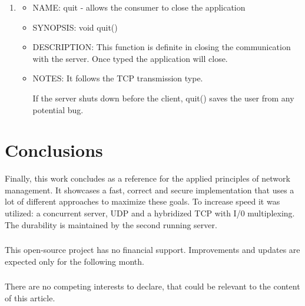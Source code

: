 \documentclass[runningheads]{llncs}
\begin{document}
\begin{enumerate}
   \item \begin{itemize} \item NAME: quit - allows the consumer to close the application
            \item SYNOPSIS: void quit()  
            \item DESCRIPTION: This function is definite in closing the communication with the server. Once typed the application will close.
            \item NOTES: It follows the TCP transmission type.
            
            If the server shuts down before the client, quit() saves the user from any potential bug.
   \end{itemize}
\end{enumerate}


\section{Conclusions}

Finally, this work concludes as a reference for the applied principles of network management. It showcases a fast, correct and secure implementation that uses a lot of different approaches to maximize these goals. To increase speed it was utilized: a concurrent server, UDP and a hybridized TCP with I/0 multiplexing. The durability is maintained by the second running server.

\begin{credits}
    \subsubsection{\ackname} This open-source project has no financial support. Improvements and updates are expected only for the following month.
    \subsubsection{\discintname}
    There are no competing interests to declare, that could be relevant to the content of this article.
    \end{credits}
    

\end{document}

